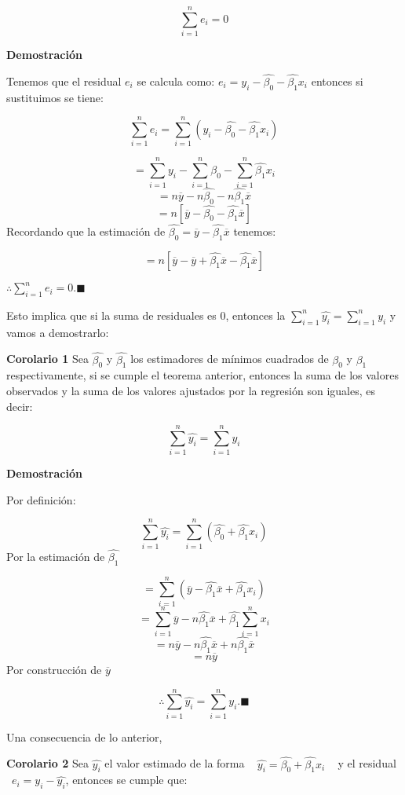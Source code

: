 \documentclass[a4paper,oneside,openany]{book}
\begin{document}
\[\sum_{i=1}^{n}e_{i}=0\]

\textbf{Demostración}

Tenemos que el residual \(e_{i}\) se calcula como:
\(e_{i}=y_{i}-\hat{\beta_{0}}-\hat{\beta_1}x_{i}\) entonces si
sustituimos se tiene:

\[\sum_{i=1}^{n}e_{i}=\sum_{i=1}^{n}\left(y_{i}-\hat{\beta_{0}}-\hat{\beta_1}x_{i}\right)\]

\[=\sum_{i=1}^{n}y_{i}-\sum_{i=1}^{n}\hat{\beta_{0}}-\sum_{i=1}^{n}\hat{\beta_{1}}x_{i}\]
\[=n\overline{y}-n\hat{\beta_{0}}-n\hat{\beta_{1}}\overline{x}\]
\[=n\left[\overline{y}-\hat{\beta_{0}}-\hat{\beta_{1}}\overline{x}\right]\]
Recordando que la estimación de
\(\hat{\beta_{0}}=\overline{y}-\hat{\beta_{1}}\overline{x}\) tenemos:

\[=n\left[\overline{y}-\overline{y}+\hat{\beta_{1}}\overline{x}-\hat{\beta_{1}}\overline{x}\right]\]

\(\therefore \sum_{i=1}^{n}e_{i}=0. \blacksquare\)

Esto implica que si la suma de residuales es 0, entonces la
\(\sum_{i=1}^{n}\hat{y_{i}}=\sum_{i=1}^{n}y_{i}\) y vamos a demostrarlo:

\textbf{Corolario 1} Sea \(\hat{\beta_{0}}\) y \(\hat{\beta_{1}}\) los
estimadores de mínimos cuadrados de \(\beta_{0}\) y \(\beta_{1}\)
respectivamente, si se cumple el teorema anterior, entonces la suma de
los valores observados y la suma de los valores ajustados por la
regresión son iguales, es decir:

\[\sum_{i=1}^{n}\hat{y_{i}}=\sum_{i=1}^{n}y_{i}\]

\textbf{Demostración}

Por definición:

\[\sum_{i=1}^{n}\hat{y_{i}}=\sum_{i=1}^{n}\left(\hat{\beta_{0}}+\hat{\beta_{1}}x_{i}\right)\]
Por la estimación de \(\hat{\beta_{1}}\)

\[=\sum_{i=1}^{n}\left(\overline{y}-\hat{\beta_{1}}\overline{x}+\hat{\beta_{1}}x_{i}\right)\]
\[=\sum_{i=1}^{n}\overline{y}-n\hat{\beta_{1}}\overline{x}+\hat{\beta_{1}}\sum_{i=1}^{n}x_{i}\]
\[=n\overline{y}-n\hat{\beta_{1}}\overline{x}+n\hat{\beta_{1}}\overline{x}\]
\[=n\overline{y}\] Por construcción de \(\overline{y}\)

\[\therefore \sum_{i=1}^{n}\hat{y_{i}}=\sum_{i=1}^{n}y_{i}. \blacksquare\]

Una consecuencia de lo anterior,

\textbf{Corolario 2} Sea \(\hat{y_{i}}\) el valor estimado de la forma ~
\(\hat{y_{i}}=\hat{\beta_{0}}+\hat{\beta_{1}}x_{i}\) ~ y el residual
~\(e_{i}=y_{i}-\hat{y_{i}}\), entonces se cumple que:
\end{document}
